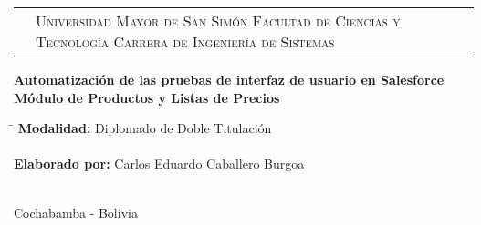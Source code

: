\newcommand{\umsslogo}{
\adjustbox{valign=t}{}
}
\newcommand{\fcytlogo}{
\adjustbox{valign=t}{}
}

\begin{titlepage}

\begin{tabular}[t]{c p{8.6cm} c}
\umsslogo &
\vfill
\large{\textsc{Universidad Mayor de San Simón}} \newline
\large{\textsc{Facultad de Ciencias y Tecnología}} \newline
\large{\textsc{Carrera de Ingeniería de Sistemas}} &
\fcytlogo \\
\end{tabular}
\vfill
\begin{center}
\huge{\bf{Automatización de las pruebas de interfaz de usuario en Salesforce\\
Módulo de Productos y Listas de Precios}}
\end{center}
\vfill
\begin{tabbing}
\hspace{4cm}\=\+
\textbf{Modalidad:} Diplomado de Doble Titulación\\
\\
\textbf{Elaborado por:} Carlos Eduardo Caballero Burgoa\\
\\
\end{tabbing}
\begin{center}
Cochabamba - Bolivia
\end{center}
\end{titlepage}

